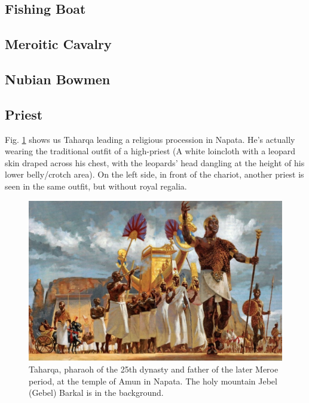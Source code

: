 \documentclass[a4paper,12pt]{scrreprt}
\begin{document}
\subsection{Fishing Boat}

\subsection{Meroitic Cavalry}

\subsection{Nubian Bowmen}

\subsection{Priest}

Fig. \ref{fig:taharqa} shows us Taharqa leading a religious procession in Napata. He’s actually wearing the traditional outfit of a high-priest (A white loincloth with a leopard skin draped across his chest, with the leopards’ head dangling at the height of his lower belly/crotch area). On the left side, in front of the chariot, another priest is seen in the same outfit, but without royal regalia.

\begin{figure}[H]
	\centering
	\includegraphics[width=\textwidth]{img/taharqa_pharaoh}
	\caption{Taharqa, pharaoh of the 25th dynasty and father of the later Meroe period, at the temple of Amun in Napata. The holy mountain Jebel (Gebel) Barkal is in the background.}\label{fig:taharqa}
\end{figure}
\end{document}
